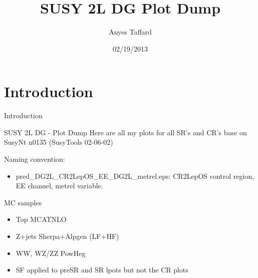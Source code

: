 \documentclass[10pt]{beamer}
\begin{document}
\author{Anyes Taffard}
\date{02/19/2013}

\title[SUSY 2L DG Plot Dump]{SUSY 2L DG Plot Dump}

\begin{frame}[plain]
  \titlepage
\end{frame}

\section{Introduction}
\begin{frame}{Introduction}
  \begin{block}{SUSY 2L DG - Plot Dump }
    Here are all my plots for all SR's and CR's base on SusyNt n0135 (SusyTools 02-06-02)

    Naming convention:
    \begin{itemize}
      \item pred\_DG2L\_CR2LepOS\_EE\_DG2L\_metrel.eps: CR2LepOS control region, EE channel, metrel variable. 
    \end{itemize}

    MC samples
    \begin{itemize}
      \item Top MCATNLO
      \item Z+jets Sherpa+Alpgen (LF+HF)
      \item WW, WZ/ZZ PowHeg
	\item SF applied to preSR and SR lpots but not the CR plots
    \end{itemize}

    

  \end{block}
\end{frame}


\end{document}
